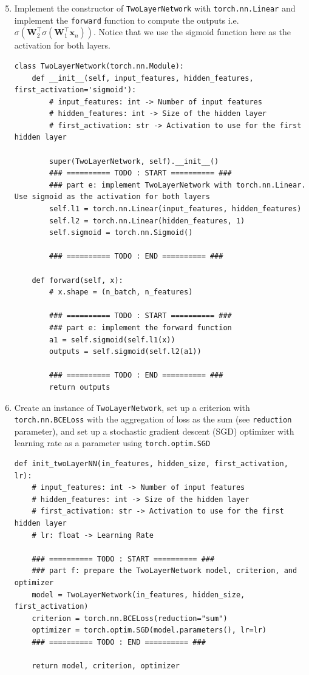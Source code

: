 \begin{enumerate}
\setcounter{enumi}{4}

\item {}
Implement the constructor of \verb|TwoLayerNetwork| with \verb|torch.nn.Linear| and implement the \verb|forward| function to compute the outputs i.e. $\sigma(\mathbf{W}_2^\top \sigma(\mathbf{W}_1^\top \mathbf{x}_n))$. Notice that we use the sigmoid function here as the activation for both layers.

\begin{verbatim}
class TwoLayerNetwork(torch.nn.Module):
    def __init__(self, input_features, hidden_features, first_activation='sigmoid'):
        # input_features: int -> Number of input features
        # hidden_features: int -> Size of the hidden layer
        # first_activation: str -> Activation to use for the first hidden layer
        
        super(TwoLayerNetwork, self).__init__()
        ### ========== TODO : START ========== ###
        ### part e: implement TwoLayerNetwork with torch.nn.Linear. Use sigmoid as the activation for both layers
        self.l1 = torch.nn.Linear(input_features, hidden_features)
        self.l2 = torch.nn.Linear(hidden_features, 1)
        self.sigmoid = torch.nn.Sigmoid()

        ### ========== TODO : END ========== ###

    def forward(self, x):
        # x.shape = (n_batch, n_features)

        ### ========== TODO : START ========== ###
        ### part e: implement the forward function
        a1 = self.sigmoid(self.l1(x))
        outputs = self.sigmoid(self.l2(a1))

        ### ========== TODO : END ========== ###
        return outputs    
\end{verbatim}

\item {}
Create an instance of \verb|TwoLayerNetwork|, set up a criterion with \verb|torch.nn.BCELoss| with the aggregation of loss as the sum (see \verb|reduction| parameter), and set up a stochastic gradient descent (SGD) optimizer with learning rate as a parameter using \verb|torch.optim.SGD| 

\begin{verbatim}
def init_twoLayerNN(in_features, hidden_size, first_activation, lr):
    # input_features: int -> Number of input features
    # hidden_features: int -> Size of the hidden layer
    # first_activation: str -> Activation to use for the first hidden layer
    # lr: float -> Learning Rate

    ### ========== TODO : START ========== ###
    ### part f: prepare the TwoLayerNetwork model, criterion, and optimizer
    model = TwoLayerNetwork(in_features, hidden_size, first_activation)
    criterion = torch.nn.BCELoss(reduction="sum")
    optimizer = torch.optim.SGD(model.parameters(), lr=lr)
    ### ========== TODO : END ========== ###

    return model, criterion, optimizer
\end{verbatim}

\end{enumerate}


